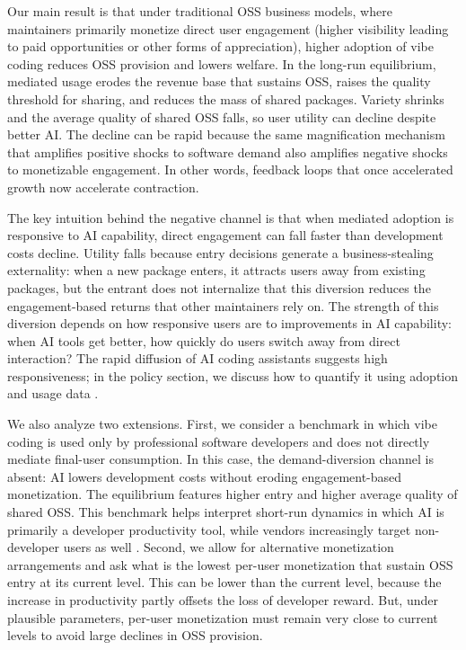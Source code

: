 \documentclass[11pt,a4paper]{article}
\theoremstyle{definition}
\theoremstyle{remark}
\begin{document}
Our main result is that under traditional OSS business models, where maintainers primarily monetize direct user engagement (higher visibility leading to paid opportunities or other forms of appreciation), higher adoption of vibe coding reduces OSS provision and lowers welfare. In the long-run equilibrium, mediated usage erodes the revenue base that sustains OSS, raises the quality threshold for sharing, and reduces the mass of shared packages. Variety shrinks and the average quality of shared OSS falls, so user utility can decline despite better AI. The decline can be rapid because the same magnification mechanism that amplifies positive shocks to software demand also amplifies negative shocks to monetizable engagement. In other words, feedback loops that once accelerated growth now accelerate contraction.

The key intuition behind the negative channel is that when mediated adoption is responsive to AI capability, direct engagement can fall faster than development costs decline. Utility falls because entry decisions generate a business-stealing externality: when a new package enters, it attracts users away from existing packages, but the entrant does not internalize that this diversion reduces the engagement-based returns that other maintainers rely on. The strength of this diversion depends on how responsive users are to improvements in AI capability: when AI tools get better, how quickly do users switch away from direct interaction? The rapid diffusion of AI coding assistants suggests high responsiveness; in the policy section, we discuss how to quantify it using adoption and usage data \citep{demirer-fradkin-tadelis-peng-2025}.

We also analyze two extensions. First, we consider a benchmark in which vibe coding is used only by professional software developers and does not directly mediate final-user consumption. In this case, the demand-diversion channel is absent: AI lowers development costs without eroding engagement-based monetization. The equilibrium features higher entry and higher average quality of shared OSS. This benchmark helps interpret short-run dynamics in which AI is primarily a developer productivity tool, while vendors increasingly target non-developer users as well \citep{anthropic-2026-cowork}. Second, we allow for alternative monetization arrangements and ask what is the lowest per-user monetization that sustain OSS entry at its current level. This can be lower than the current level, because the increase in productivity partly offsets the loss of developer reward. But, under plausible parameters, per-user monetization must remain very close to current levels to avoid large declines in OSS provision.
\end{document}
